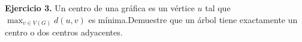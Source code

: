 \textbf{Ejercicio 3.} Un centro de una gráfica es un vértice $u$ tal que 
$\max_{v\in V(G)}d(u, v)$ es mínima.Demuestre que un árbol tiene exactamente 
un centro o dos centros adyacentes.